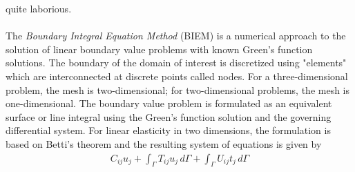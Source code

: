 \documentclass[12pt]{article}
\begin{document}
quite laborious.\\\\
The \textit{Boundary Integral Equation  Method} (BIEM) is a numerical approach to the solution of
linear boundary value problems with known Green's function solutions. The boundary of the
domain of interest is discretized using "elements" which are interconnected at discrete points called
nodes. For a three-dimensional problem, the mesh is two-dimensional; for two-dimensional
problems, the mesh is one-dimensional. The boundary value problem is formulated as an equivalent
surface or line integral using the Green's function solution and the governing differential system.
For linear elasticity in two dimensions, the formulation is based on Betti's theorem and the resulting
system of equations is given by
\begin{align*}
    C_{ij}u_j + \int_{\varGamma} T_{ij}u_j  \,d\varGamma + \int_{\varGamma} U_{ij}t_j  \,d\varGamma \tag{13} \label{13}
\end{align*}
\end{document}
